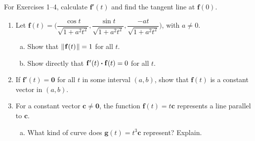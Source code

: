 \startexercises\label{sec1dot8}
\par\noindent For Exercises 1--4, calculate $\mathbf{f}'(t)$ and find the tangent line at $\mathbf{f}(0)$.
\begin{enumerate}[\bfseries 1.]
\par\noindent For Exercises 5--6, find the velocity $\mathbf{v}(t)$ and acceleration $\mathbf{a}(t)$ of an object
with the given position vector $\mathbf{r}(t)$.
[{[\bfseries 1.]}]
[{[\bfseries 1.]}]
 \item Let $\mathbf{f}(t) = \biggl( \dfrac{\cos t}{\sqrt{1 + a^2 t^2}},\dfrac{\sin t}{\sqrt{1 + a^2 t^2}},
  \dfrac{-at}{\sqrt{1 + a^2 t^2}} \biggr)$, with $a \ne 0$.
  \begin{enumerate}[(a)]
   \item Show that $\lVert\mspace{1mu}\mathbf{f}(t)\mspace{1mu}\rVert = 1$ for all $t$.
   \item Show directly that $\mathbf{f}'(t) \bm{\cdot} \mathbf{f}(t) = 0$ for all $t$.
  \end{enumerate}
 \item If $\mathbf{f}'(t) = \mathbf{0}$ for all $t$ in some interval $(a,b)$, show that $\mathbf{f}(t)$ is
  a constant vector in $(a,b)$.
 \item For a constant vector $\mathbf{c} \ne \mathbf{0}$, the function $\mathbf{f}(t) = t\mathbf{c}$ represents a line
  parallel to $\mathbf{c}$.
  \begin{enumerate}[(a)]
   \item What kind of curve does $\mathbf{g}(t) = t^3\mathbf{c}$ represent? Explain.

\end{enumerate}
\end{enumerate}
